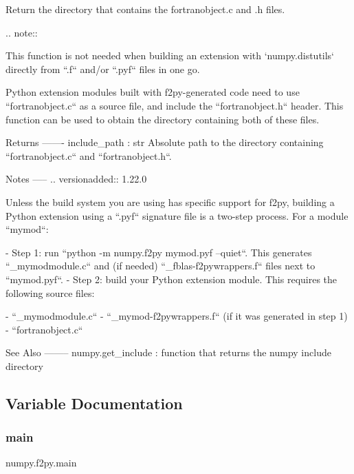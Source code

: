 \begin{DoxyVerb}Return the directory that contains the fortranobject.c and .h files.

.. note::

    This function is not needed when building an extension with
    `numpy.distutils` directly from ``.f`` and/or ``.pyf`` files
    in one go.

Python extension modules built with f2py-generated code need to use
``fortranobject.c`` as a source file, and include the ``fortranobject.h``
header. This function can be used to obtain the directory containing
both of these files.

Returns
-------
include_path : str
    Absolute path to the directory containing ``fortranobject.c`` and
    ``fortranobject.h``.

Notes
-----
.. versionadded:: 1.22.0

Unless the build system you are using has specific support for f2py,
building a Python extension using a ``.pyf`` signature file is a two-step
process. For a module ``mymod``:

    - Step 1: run ``python -m numpy.f2py mymod.pyf --quiet``. This
      generates ``_mymodmodule.c`` and (if needed)
      ``_fblas-f2pywrappers.f`` files next to ``mymod.pyf``.
    - Step 2: build your Python extension module. This requires the
      following source files:

          - ``_mymodmodule.c``
          - ``_mymod-f2pywrappers.f`` (if it was generated in step 1)
          - ``fortranobject.c``

See Also
--------
numpy.get_include : function that returns the numpy include directory\end{DoxyVerb}
 

\subsection{Variable Documentation}
\mbox{\label{namespacenumpy_1_1f2py_aa1d5945d8dfb724d522255a5800ceb6a}} 
\subsubsection{\texorpdfstring{main}{main}}
{\footnotesize\ttfamily numpy.\+f2py.\+main}

\mbox{\label{namespacenumpy_1_1f2py_a919efb5b504fa6d7d964c281a6df424e}} 
